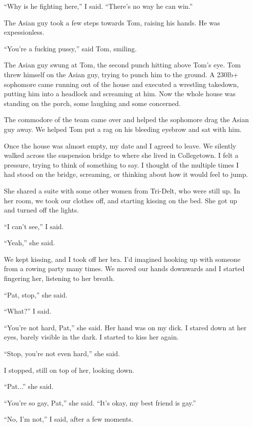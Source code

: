 ``Why is he fighting here,'' I said.  ``There's no way he can win.'' 

The Asian guy took a few steps towards Tom, raising his hands.  He was
expessionless.

``You're a fucking pussy,'' said Tom, smiling. 

The Asian guy swung at Tom, the second punch hitting above Tom's eye.  Tom threw
himself on the Asian guy, trying to punch him to the ground.  A 230lb+ sophomore
came running out of the house and executed a wrestling takedown, putting him
into a headlock and screaming at him.   Now the whole house was standing on the
porch, some laughing and some concerned.

The commodore of the team came over and helped the sophomore drag the Asian guy
away.  We helped Tom put a rag on his bleeding eyebrow and sat with him.

Once the house was almost empty, my date and I agreed to leave.  We silently
walked across the suspension bridge to where she lived in Collegetown.  I felt a
pressure, trying to think of something to say.  I thought of the multiple times
I had stood on the bridge, screaming, or thinking about how it would feel to
jump.

She shared a suite with some other women from Tri-Delt, who were still up.  In
her room, we took our clothes off, and starting kissing on the bed.  She got up
and turned off the lights.

``I can't see,'' I said.  

``Yeah,'' she said.

We kept kissing, and I took off her bra.  I'd imagined hooking up with someone
from a rowing party many times.  We moved our hands downwards and I started
fingering her, listening to her breath.

``Pat, stop,'' she said.

``What?'' I said.

``You're not hard, Pat,'' she said.  Her hand was on my dick.  I stared down at
her eyes, barely visible in the dark.  I started to kiss her again.

``Stop, you're not even hard,'' she said.

I stopped, still on top of her, looking down.

``Pat...'' she said.

``You're so gay, Pat,'' she said.  ``It's okay, my best friend is gay.''

``No, I'm not,'' I said, after a few moments.

